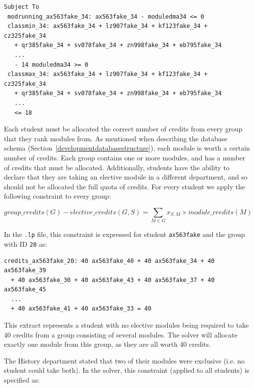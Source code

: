 \begin{lstlisting}
Subject To
 modrunning_ax563fake_34: ax563fake_34 - moduledma34 <= 0
 classmin_34: ax563fake_34 + lz907fake_34 + kf123fake_34 + cz325fake_34
   + qr385fake_34 + sv078fake_34 + zn998fake_34 + eb795fake_34
   ...
   - 14 moduledma34 >= 0
 classmax_34: ax563fake_34 + lz907fake_34 + kf123fake_34 + cz325fake_34
   + qr385fake_34 + sv078fake_34 + zn998fake_34 + eb795fake_34
   ...
   <= 18
\end{lstlisting}

\mynobreakpar

Each student must be allocated the correct number of credits from every group
that they rank modules from. As mentioned when describing the database schema
(Section~\ref{developmentdatabasestructure}), each module is worth a certain
number of credits. Each group contains one or more modules, and has a number
of credits that must be allocated. Additionally, students have the ability to
declare that they are taking an elective module in a different department, and
so should not be allocated the full quota of credits. For every student we
apply the following constraint to every group:\mynobreakpar

$$
group\_credits(G) - elective\_credits(G,S) = \displaystyle\sum_{M \in G} x_{S,M} \times module\_credits(M)
$$

In the \texttt{.lp} file, this constraint is expressed for student
\texttt{ax563fake} and the group with ID \texttt{20} as:\mynobreakpar

\begin{lstlisting}
credits_ax563fake_20: 40 ax563fake_40 + 40 ax563fake_34 + 40 ax563fake_39
  + 40 ax563fake_30 + 40 ax563fake_43 + 40 ax563fake_37 + 40 ax563fake_45
  ...
  + 40 ax563fake_41 + 40 ax563fake_33 = 40
\end{lstlisting}

This extract represents a student with no elective modules being required to
take 40 credits from a group consisting of several modules. The solver will
allocate exactly one module from this group, as they are all worth 40 credits.

\mynobreakpar

The History department stated that two of their modules were exclusive (i.e.
no student could take both). In the solver, this constraint (applied to all
students) is specified as:\mynobreakpar


